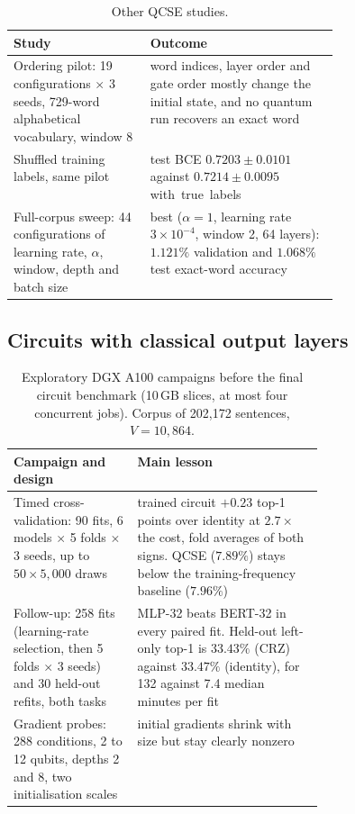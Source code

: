 \documentclass[11pt,a4paper]{article}
\begin{document}
  \begin{table}[H]
    \centering\small
    \caption{Other QCSE studies.}
    \label{tab:qcse-other}
    \begin{tabularx}{\linewidth}{@{}P{0.42\linewidth}L@{}}
      \toprule
      Study                                                                                          & Outcome                                                                                                                            \\
      \midrule
      Ordering pilot: 19 configurations $\times$ 3 seeds, 729-word alphabetical vocabulary, window 8 & word indices, layer order and gate order mostly change the initial state, and no quantum run recovers an exact word                    \\
      Shuffled training labels, same pilot                                                           & test BCE $0.7203\pm0.0101$ against $0.7214\pm0.0095$ with~true~labels                                                              \\
      Full-corpus sweep: 44 configurations of learning rate, $\alpha$, window, depth and batch size  & best ($\alpha=1$, learning rate $3\times10^{-4}$, window 2, 64 layers): $1.121\%$ validation and $1.068\%$ test exact-word accuracy \\
      \bottomrule
    \end{tabularx}
  \end{table}

  \subsection{Circuits with classical output layers}

  \begin{table}[H]
    \centering\small
    \caption{Exploratory DGX A100 campaigns before the final circuit benchmark (10\,GB slices, at most four concurrent jobs). Corpus of 202,172 sentences, $V=10{,}864$.}
    \label{tab:campaigns}
    \begin{tabularx}{\linewidth}{@{}P{0.4\linewidth}L@{}}
      \toprule
      Campaign and design & Main lesson \\
      \midrule
      Timed cross-validation: 90 fits, 6 models $\times$ 5 folds $\times$ 3 seeds, up to $50\times5{,}000$ draws & trained circuit $+0.23$ top-1 points over identity at $2.7\times$ the cost, fold averages of both signs. QCSE ($7.89\%$) stays below the training-frequency baseline ($7.96\%$) \\
      Follow-up: 258 fits (learning-rate selection, then 5 folds $\times$ 3 seeds) and 30 held-out refits, both tasks & MLP-32 beats BERT-32 in every paired fit. Held-out left-only top-1 is $33.43\%$ (CRZ) against $33.47\%$ (identity), for 132 against 7.4 median minutes per fit \\
      Gradient probes: 288 conditions, 2 to 12 qubits, depths 2 and 8, two initialisation scales & initial gradients shrink with size but stay clearly nonzero \\
      \bottomrule
    \end{tabularx}
  \end{table}
\end{document}
